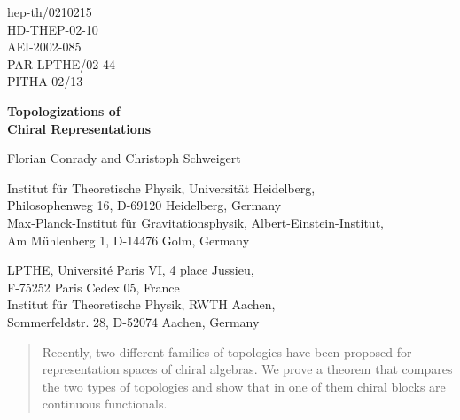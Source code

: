 \documentclass[a4paper,12pt,twoside]{article}
\begin{document}
\thispagestyle{empty}
\hfill
\parbox[t]{3.6cm}{
hep-th/0210215 \\
HD-THEP-02-10 \\
AEI-2002-085 \\
PAR-LPTHE/02-44 \\
PITHA 02/13 \\}
\vspace{2ex}

\begin{center}
\bf\LARGE Topologizations of \\ Chiral Representations
\end{center}

\renewcommand{\thefootnote}{\fnsymbol{footnote}}
\begin{center}
\large Florian Conrady\coordHE{} and Christoph Schweigert\coordHE{}
\end{center}
{\small\it
\begin{center}
\coordHE{}Institut f\"{u}r Theoretische Physik, Universit\"{a}t Heidelberg, \\ Philosophenweg 16, D-69120 Heidelberg, Germany \\
\coordHE{}Max-Planck-Institut f\"{u}r Gravitationsphysik, Albert-Einstein-Institut, \\ Am M\"{u}hlenberg 1, D-14476 Golm, Germany
\end{center}
\begin{center}
\coordHE{}LPTHE, Universit\'{e} Paris VI, 4 place Jussieu, \\ F-75252 Paris Cedex 05, France \\
\coordHE{}Institut f\"{u}r Theoretische Physik, RWTH Aachen, \\ Sommerfeldstr. 28, D-52074 Aachen, Germany
\end{center}}
\renewcommand{\thefootnote}{\arabic{footnote}}
\setcounter{footnote}{0}
\begin{abstract}
\noindent
Recently,
two different families of topologies have been proposed for
representation spaces of chiral algebras. We prove a theorem that compares
the two types of topologies
and show that in one of them
chiral blocks are
continuous functionals.
\end{abstract}
\setlength{\jot}{2.5mm}
\end{document}
